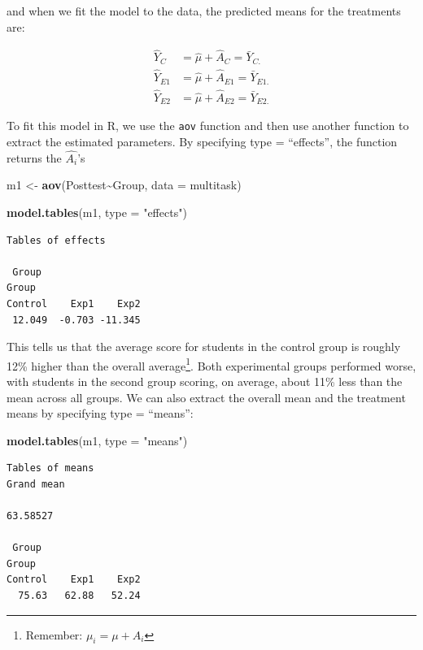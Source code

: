 \documentclass[
  letterpaper,
]{book}
\newenvironment{Shaded}{\begin{snugshade}}{\end{snugshade}}
\newcommand{\AttributeTok}[1]{\textcolor[rgb]{0.13,0.29,0.53}{#1}}
\newcommand{\FunctionTok}[1]{\textcolor[rgb]{0.13,0.29,0.53}{\textbf{#1}}}
\newcommand{\NormalTok}[1]{#1}
\newcommand{\OtherTok}[1]{\textcolor[rgb]{0.56,0.35,0.01}{#1}}
\newcommand{\SpecialCharTok}[1]{\textcolor[rgb]{0.81,0.36,0.00}{\textbf{#1}}}
\newcommand{\StringTok}[1]{\textcolor[rgb]{0.31,0.60,0.02}{#1}}
\begin{document}
and when we fit the model to the data, the predicted means for the
treatments are:

\begin{equation}
\begin{aligned}
\hat{Y}_{C} &= \hat{\mu} + \hat{A}_C = \bar{Y}_{C.}\\ 
\hat{Y}_{E1} &= \hat{\mu} + \hat{A}_{E1} = \bar{Y}_{E1.}\\ 
\hat{Y}_{E2} &= \hat{\mu} + \hat{A}_{E2} = \bar{Y}_{E2.}
\end{aligned}
\end{equation}

To fit this model in R, we use the \texttt{aov} function and then use
another function to extract the estimated parameters. By specifying type
= ``effects'', the function returns the \(\hat{A_i}\)'s

\begin{Shaded}
\begin{Highlighting}[]
\NormalTok{m1 }\OtherTok{\textless{}{-}} \FunctionTok{aov}\NormalTok{(Posttest}\SpecialCharTok{\textasciitilde{}}\NormalTok{Group, }\AttributeTok{data =}\NormalTok{ multitask)}

\FunctionTok{model.tables}\NormalTok{(m1, }\AttributeTok{type =} \StringTok{"effects"}\NormalTok{)}
\end{Highlighting}
\end{Shaded}

\begin{verbatim}
Tables of effects

 Group 
Group
Control    Exp1    Exp2 
 12.049  -0.703 -11.345 
\end{verbatim}

This tells us that the average score for students in the control group
is roughly 12\% higher than the overall average\footnote{Remember:
  \(\mu_i = \mu + A_i\)}. Both experimental groups performed worse, with
students in the second group scoring, on average, about 11\% less than
the mean across all groups. We can also extract the overall mean and the
treatment means by specifying type = ``means'':

\begin{Shaded}
\begin{Highlighting}[]
\FunctionTok{model.tables}\NormalTok{(m1, }\AttributeTok{type =} \StringTok{"means"}\NormalTok{)}
\end{Highlighting}
\end{Shaded}

\begin{verbatim}
Tables of means
Grand mean
         
63.58527 

 Group 
Group
Control    Exp1    Exp2 
  75.63   62.88   52.24 
\end{verbatim}
\end{document}
